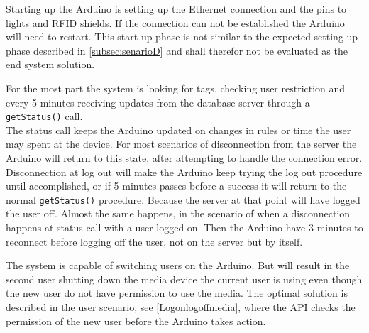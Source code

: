 Starting up the Arduino is setting up the Ethernet connection and the pins to lights and RFID shields. If the connection can not be established  the Arduino will need to restart. This start up phase is not similar to the expected setting up phase described in \ref{subsec:senarioD} and shall therefor not be evaluated as the end system solution.

For the most part the system is looking for tags, checking user restriction and every 5 minutes receiving updates from the database server through a \verb|getStatus()| call. \\
The status call keeps the Arduino updated on changes in rules or time the user may spent at the device.      
For most scenarios of disconnection from the server the Arduino will return to this state, after attempting to handle the connection error.
Disconnection at log out will make the Arduino keep trying the log out procedure until accomplished, or if 5 minutes passes before a success it will return to the normal \verb|getStatus()| procedure. Because the server at that point will have logged the user off.
Almost the same happens, in the scenario of when a disconnection happens at status call with a user logged on. Then the Arduino have 3 minutes to reconnect before logging off the user, not on the server but by itself. 

The system is capable of switching users on the Arduino. But will result in the second user shutting down the media device the current user is using even though the new user do not have permission to use the media. The optimal solution is described in the user scenario, see \ref{Logonlogoffmedia}, where the API checks the permission of the new user before the Arduino takes action.       
